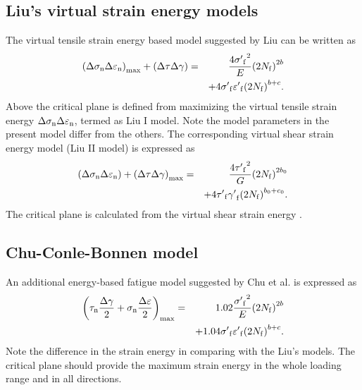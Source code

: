 \documentclass[preprint,5p,twocolumn,10pt,sort&compress]{elsarticle}
\begin{document}
\subsection{Liu's virtual strain energy models}
The virtual tensile strain energy based model suggested by Liu \cite{Liu1993} can be written as
\begin{eqnarray}
{\left( {\Delta {\sigma _{\rm n}}\Delta {\varepsilon _{\rm n}}} \right)_{\max }} + \left( {\Delta \tau \Delta \gamma } \right) &=& \frac{{4{{\sigma '}_{\rm f}}^2}}{E}{\left( {2{N_{\rm f}}} \right)^{2b}}
\\
& & + 4{{\sigma '}_{\rm f}}{{\varepsilon '}_{\rm f}}{\left( {2{N_{\rm f}}} \right)^{b + c}}. \nonumber
\end{eqnarray}
Above the critical plane is defined from maximizing the virtual tensile strain energy ${\Delta {\sigma _{\rm n}}\Delta {\varepsilon _{\rm n}}}$, termed as Liu I model. Note the model parameters in the present model differ from the others. The corresponding virtual shear strain energy model (Liu II model) is expressed as
\begin{eqnarray}
\left( {\Delta {\sigma _{\rm n}}\Delta {\varepsilon _{\rm n}}} \right) + {\left( {\Delta \tau \Delta \gamma } \right)_{\max }} &=& \frac{{4{{\tau '}_{\rm f}}^2}}{G}{\left( {2{N_{\rm f}}} \right)^{2b_0 }}
\\
&& + 4{{\tau '}_{\rm f}}{{\gamma '}_{\rm f}}{\left( {2{N_{\rm f}}} \right)^{b_0  + c_0 }}. \nonumber
\end{eqnarray}
The critical plane is calculated from the virtual shear strain energy \cite{Liu1993}.

\subsection{Chu-Conle-Bonnen model}
An additional energy-based fatigue model suggested by Chu et al. \cite{Chu1993} is expressed as
\begin{eqnarray}
{\left( {{\tau _{\rm n}}\frac{{\Delta \gamma }}{2} + {\sigma _{\rm n }}\frac{{\Delta \varepsilon }}{2}} \right)_{\max }} &=& 1.02\frac{{{{\sigma '}_{\rm f}}^2}}{E}{\left( {2{N_{\rm f}}} \right)^{2b}} \\
&& + 1.04{{\sigma '}_{\rm f}}{{\varepsilon '}_{\rm f}}{\left( {2{N_{\rm f}}} \right)^{b + c}}. \nonumber
\end{eqnarray}
Note the difference in the strain energy in comparing with the Liu's models. The critical plane should provide the maximum strain energy in the whole loading range and in all directions.
\end{document}
